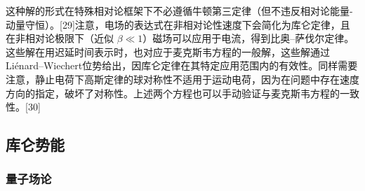 这种解的形式在特殊相对论框架下不必遵循牛顿第三定律（但不违反相对论能量-动量守恒）。[29]注意，电场的表达式在非相对论性速度下会简化为库仑定律，且在非相对论极限下（近似 \( \beta \ll 1 \)）磁场可以应用于电流，得到比奥–萨伐尔定律。这些解在用迟延时间表示时，也对应于麦克斯韦方程的一般解，这些解通过Liénard–Wiechert位势给出，因库仑定律在其特定应用范围内的有效性。同样需要注意，静止电荷下高斯定律的球对称性不适用于运动电荷，因为在问题中存在速度方向的指定，破坏了对称性。上述两个方程也可以手动验证与麦克斯韦方程的一致性。[30]
\subsection{库仑势能}  
\subsubsection{量子场论}